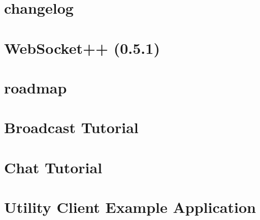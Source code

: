 \documentclass[twoside]{book}
\newcommand{\+}{\discretionary{\mbox{\scriptsize$\hookleftarrow$}}{}{}}
\begin{document}
\chapter{changelog}
\label{md__home_network_NSOL_ndnSIM-dev_ns-3_src_ndnSIM_NFD_websocketpp_changelog}
\hypertarget{md__home_network_NSOL_ndnSIM-dev_ns-3_src_ndnSIM_NFD_websocketpp_changelog}{}

\chapter{Web\+Socket++ (0.5.1)}
\label{md__home_network_NSOL_ndnSIM-dev_ns-3_src_ndnSIM_NFD_websocketpp_readme}
\hypertarget{md__home_network_NSOL_ndnSIM-dev_ns-3_src_ndnSIM_NFD_websocketpp_readme}{}

\chapter{roadmap}
\label{md__home_network_NSOL_ndnSIM-dev_ns-3_src_ndnSIM_NFD_websocketpp_roadmap}
\hypertarget{md__home_network_NSOL_ndnSIM-dev_ns-3_src_ndnSIM_NFD_websocketpp_roadmap}{}

\chapter{Broadcast Tutorial}
\label{md__home_network_NSOL_ndnSIM-dev_ns-3_src_ndnSIM_NFD_websocketpp_tutorials_broadcast_tutorial_broadcast_tutorial}
\hypertarget{md__home_network_NSOL_ndnSIM-dev_ns-3_src_ndnSIM_NFD_websocketpp_tutorials_broadcast_tutorial_broadcast_tutorial}{}

\chapter{Chat Tutorial}
\label{md__home_network_NSOL_ndnSIM-dev_ns-3_src_ndnSIM_NFD_websocketpp_tutorials_chat_tutorial_chat_tutorial}
\hypertarget{md__home_network_NSOL_ndnSIM-dev_ns-3_src_ndnSIM_NFD_websocketpp_tutorials_chat_tutorial_chat_tutorial}{}

\chapter{Utility Client Example Application}
\label{md__home_network_NSOL_ndnSIM-dev_ns-3_src_ndnSIM_NFD_websocketpp_tutorials_utility_client_utility_client}
\hypertarget{md__home_network_NSOL_ndnSIM-dev_ns-3_src_ndnSIM_NFD_websocketpp_tutorials_utility_client_utility_client}{}

\end{document}
